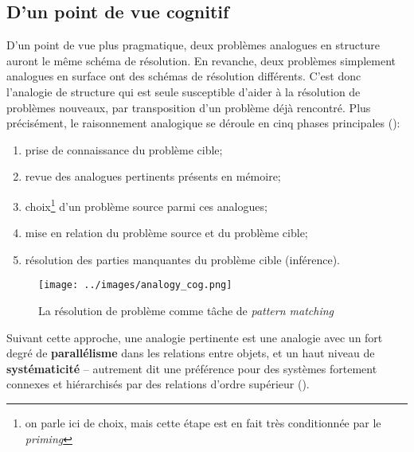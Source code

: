 \documentclass[french]{article}
\begin{document}
		\subsection{D'un point de vue cognitif}\label{analogy_cog}
		D'un point de vue plus pragmatique, deux problèmes analogues en structure auront le même schéma de résolution. En revanche, deux problèmes simplement analogues en surface ont des schémas de résolution différents. C'est donc l'analogie de structure qui est seule susceptible d'aider à la résolution de problèmes nouveaux, par transposition d'un problème déjà rencontré. Plus précisément, le raisonnement analogique se déroule en cinq phases principales (\cite{gentner1997,holyoak2012}):
		\begin{center}
			\begin{minipage}{.6\textwidth}
			\begin{enumerate}
			\item prise de connaissance du problème cible;
			\item revue des analogues pertinents présents en mémoire;
			\item choix\footnote{on parle ici de choix, mais cette étape est en fait très conditionnée par le \textit{priming}} d'un problème source parmi ces analogues;
			\item mise en relation du problème source et du problème cible;
			\item résolution des parties manquantes du problème cible (inférence).
		\end{enumerate}
		\end{minipage}\qquad
		\begin{minipage}{.3\textwidth}
				\begin{figure}[H]
			\centering
			\texttt{[image: ../images/analogy\_cog.png]}
			\caption{La résolution de problème comme tâche de \textit{pattern matching}}
		\end{figure}
		\end{minipage}
		\end{center}
		Suivant cette approche, une analogie pertinente est une analogie avec un fort degré de \textbf{parallélisme} dans les relations entre objets, et un haut niveau de \textbf{systématicité} -- autrement dit une préférence pour des systèmes fortement connexes et hiérarchisés par des relations d'ordre supérieur (\cite{gentner1997, holyoak2012}).\\
		
\end{document}
